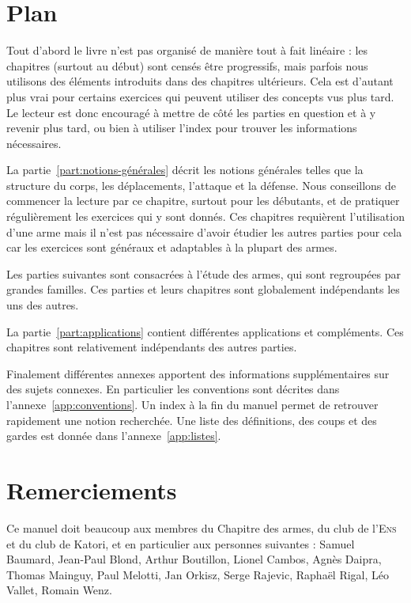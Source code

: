 \section{Plan}


Tout d'abord le livre n'est pas organisé de manière tout à fait linéaire : les chapitres (surtout au début) sont censés être progressifs, mais parfois nous utilisons des éléments introduits dans des chapitres ultérieurs.
Cela est d'autant plus vrai pour certains exercices qui peuvent utiliser des concepts vus plus tard. 
Le lecteur est donc encouragé à mettre de côté les parties en question et à y revenir plus tard, ou bien à utiliser l'index pour trouver les informations nécessaires.

La partie~\ref{part:notions-générales} décrit les notions générales telles que la structure du corps, les déplacements, l'attaque et la défense.
Nous conseillons de commencer la lecture par ce chapitre, surtout pour les débutants, et de pratiquer régulièrement les exercices qui y sont donnés.
Ces chapitres requièrent l'utilisation d'une arme mais il n'est pas nécessaire d'avoir étudier les autres parties pour cela car les exercices sont généraux et adaptables à la plupart des armes.

Les parties suivantes sont consacrées à l'étude des armes, qui sont regroupées par grandes familles.
Ces parties et leurs chapitres sont globalement indépendants les uns des autres.

La partie~\ref{part:applications} contient différentes applications et compléments.
Ces chapitres sont relativement indépendants des autres parties.

Finalement différentes annexes apportent des informations supplémentaires sur des sujets connexes.
En particulier les conventions sont décrites dans l'annexe~\ref{app:conventions}.
Un index à la fin du manuel permet de retrouver rapidement une notion recherchée.
Une liste des définitions, des coups et des gardes est donnée dans l'annexe~\ref{app:listes}.



\section{Remerciements}


Ce manuel doit beaucoup aux membres du Chapitre des armes, du club de l'\textsc{Ens} et du club de Katori, et en particulier aux personnes suivantes : Samuel Baumard, Jean-Paul Blond, Arthur Boutillon, Lionel Cambos, Agnès Daipra, Thomas Mainguy, Paul Melotti, Jan Orkisz, Serge Rajevic, Raphaël Rigal, Léo Vallet, Romain Wenz.
